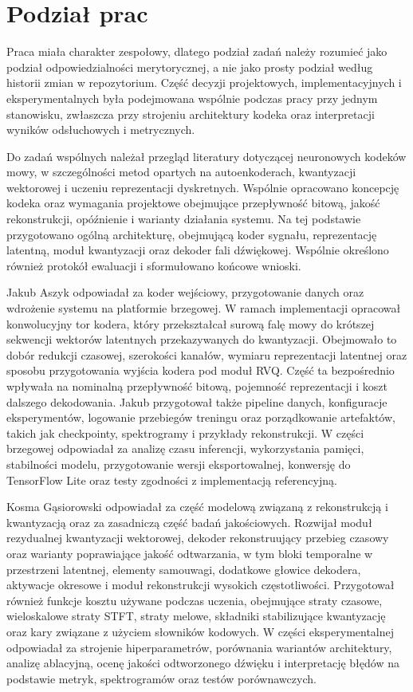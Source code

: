 \section{Podział prac}
\label{sec:podzial-prac}

Praca miała charakter zespołowy, dlatego podział zadań należy rozumieć jako podział odpowiedzialności merytorycznej, a nie jako prosty podział według historii zmian w repozytorium. Część decyzji projektowych, implementacyjnych i eksperymentalnych była podejmowana wspólnie podczas pracy przy jednym stanowisku, zwłaszcza przy strojeniu architektury kodeka oraz interpretacji wyników odsłuchowych i metrycznych.

Do zadań wspólnych należał przegląd literatury dotyczącej neuronowych kodeków mowy, w szczególności metod opartych na autoenkoderach, kwantyzacji wektorowej i uczeniu reprezentacji dyskretnych. Wspólnie opracowano koncepcję kodeka oraz wymagania projektowe obejmujące przepływność bitową, jakość rekonstrukcji, opóźnienie i warianty działania systemu. Na tej podstawie przygotowano ogólną architekturę, obejmującą koder sygnału, reprezentację latentną, moduł kwantyzacji oraz dekoder fali dźwiękowej. Wspólnie określono również protokół ewaluacji i sformułowano końcowe wnioski.

Jakub Aszyk odpowiadał za koder wejściowy, przygotowanie danych oraz wdrożenie systemu na platformie brzegowej. W ramach implementacji opracował konwolucyjny tor kodera, który przekształcał surową falę mowy do krótszej sekwencji wektorów latentnych przekazywanych do kwantyzacji. Obejmowało to dobór redukcji czasowej, szerokości kanałów, wymiaru reprezentacji latentnej oraz sposobu przygotowania wyjścia kodera pod moduł RVQ. Część ta bezpośrednio wpływała na nominalną przepływność bitową, pojemność reprezentacji i koszt dalszego dekodowania. Jakub przygotował także pipeline danych, konfiguracje eksperymentów, logowanie przebiegów treningu oraz porządkowanie artefaktów, takich jak checkpointy, spektrogramy i przykłady rekonstrukcji. W części brzegowej odpowiadał za analizę czasu inferencji, wykorzystania pamięci, stabilności modelu, przygotowanie wersji eksportowalnej, konwersję do TensorFlow Lite oraz testy zgodności z implementacją referencyjną.

Kosma Gąsiorowski odpowiadał za część modelową związaną z rekonstrukcją i kwantyzacją oraz za zasadniczą część badań jakościowych. Rozwijał moduł rezydualnej kwantyzacji wektorowej, dekoder rekonstruujący przebieg czasowy oraz warianty poprawiające jakość odtwarzania, w tym bloki temporalne w przestrzeni latentnej, elementy samouwagi, dodatkowe głowice dekodera, aktywacje okresowe i moduł rekonstrukcji wysokich częstotliwości. Przygotował również funkcje kosztu używane podczas uczenia, obejmujące straty czasowe, wieloskalowe straty STFT, straty melowe, składniki stabilizujące kwantyzację oraz kary związane z użyciem słowników kodowych. W części eksperymentalnej odpowiadał za strojenie hiperparametrów, porównania wariantów architektury, analizę ablacyjną, ocenę jakości odtworzonego dźwięku i interpretację błędów na podstawie metryk, spektrogramów oraz testów porównawczych.
